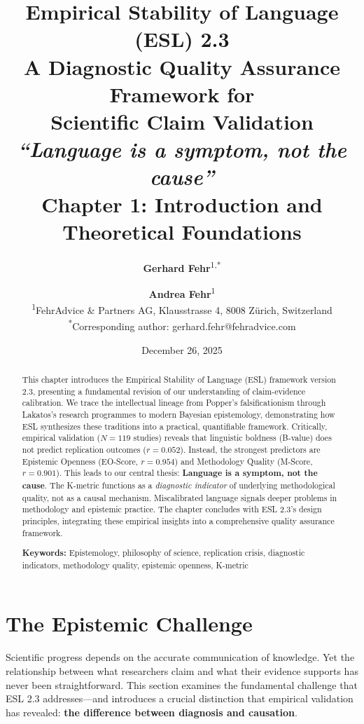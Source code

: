 \documentclass[11pt,a4paper]{article}
\title{%
    \Large \textbf{Empirical Stability of Language (ESL) 2.3} \\[0.5em]
    \large A Diagnostic Quality Assurance Framework for \\
    Scientific Claim Validation \\[0.3em]
    \small \textit{``Language is a symptom, not the cause''} \\[1em]
    \LARGE \textbf{Chapter 1: Introduction and Theoretical Foundations}
}
\author{%
    \textbf{Gerhard Fehr}\textsuperscript{1,*} \and \textbf{Andrea Fehr}\textsuperscript{1} \\[0.5em]
    \textsuperscript{1}FehrAdvice \& Partners AG, Klausstrasse 4, 8008 Zürich, Switzerland \\[0.3em]
    \textsuperscript{*}Corresponding author: gerhard.fehr@fehradvice.com
}
\date{December 26, 2025}
\begin{document}
\maketitle


\begin{abstract}
\noindent
This chapter introduces the Empirical Stability of Language (ESL) framework version 2.3, presenting a fundamental revision of our understanding of claim-evidence calibration. We trace the intellectual lineage from Popper's falsificationism through Lakatos's research programmes to modern Bayesian epistemology, demonstrating how ESL synthesizes these traditions into a practical, quantifiable framework. Critically, empirical validation ($N = 119$ studies) reveals that linguistic boldness (B-value) does not predict replication outcomes ($r = 0.052$). Instead, the strongest predictors are Epistemic Openness (EO-Score, $r = 0.954$) and Methodology Quality (M-Score, $r = 0.901$). This leads to our central thesis: \textbf{Language is a symptom, not the cause}. The K-metric functions as a \textit{diagnostic indicator} of underlying methodological quality, not as a causal mechanism. Miscalibrated language signals deeper problems in methodology and epistemic practice. The chapter concludes with ESL 2.3's design principles, integrating these empirical insights into a comprehensive quality assurance framework.

\vspace{0.5em}
\noindent\textbf{Keywords:} Epistemology, philosophy of science, replication crisis, diagnostic indicators, methodology quality, epistemic openness, K-metric
\end{abstract}

\tableofcontents
\newpage


\section{The Epistemic Challenge}
\label{sec:epistemic-challenge}

Scientific progress depends on the accurate communication of knowledge. Yet the relationship between what researchers claim and what their evidence supports has never been straightforward. This section examines the fundamental challenge that ESL 2.3 addresses---and introduces a crucial distinction that empirical validation has revealed: \textbf{the difference between diagnosis and causation}.
\end{document}
